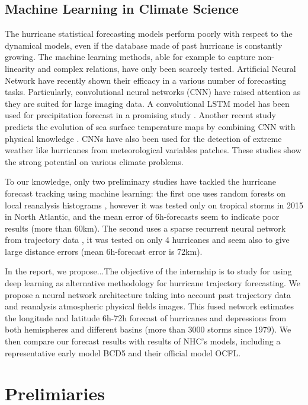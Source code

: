 \section{Machine Learning in Climate Science}

The hurricane statistical forecasting models perform poorly with respect to the dynamical models, even if the database made of past hurricane is constantly growing. The machine learning methods, able for example to capture non-linearity and complex relations, have only been scarcely tested. Artificial Neural Network have recently shown their efficacy in a various number of forecasting tasks. Particularly, convolutional neural networks (CNN) have raised attention as they are suited for large imaging data. A convolutional LSTM model has been used for precipitation forecast in a promising study \cite{xingjian2015convolutional}. Another recent study predicts the evolution of sea surface temperature maps by combining CNN with physical knowledge \cite{de2017deep}. CNNs have also been used for the detection of extreme weather like hurricanes from meteorological variables patches\cite{racah2017extremeweather}. These studies show the strong potential on various climate problems. 

To our knowledge, only two preliminary studies have tackled the hurricane forecast tracking using machine learning: the first one uses random forests on local reanalysis histograms \cite{liberge2011prevision}, however it was tested only on tropical storms in 2015 in North Atlantic, and the mean error of 6h-forecasts seem to indicate poor results (more than 60km). The second uses a sparse recurrent neural network from trajectory data \cite{moradi2016sparse}, it was tested on only 4 hurricanes and seem also to give large distance errors (mean 6h-forecast error is 72km). 

In the report, we propose...The objective of the internship is to study for using deep learning as alternative methodology for hurricane trajectory forecasting. We propose a neural network architecture taking into account past trajectory data and reanalysis atmospheric physical fields images. This fused network estimates the longitude and latitude 6h-72h forecast of hurricanes and depressions from both hemispheres and different basins (more than 3000 storms since 1979). We then compare our forecast results with results of NHC's models, including a representative early model BCD5 and their official model OCFL. 


\chapter{Prelimiaries}

